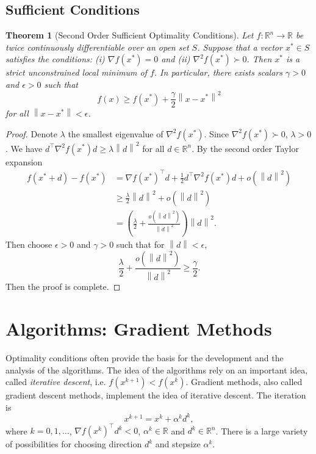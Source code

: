 \documentclass[12pt,a4paper]{report}
\numberwithin{equation}{section}
\theoremstyle{mystyle}
\newtheorem{theorem}[definition]{Theorem}
\newcommand{\R}{\mathbb{R}}
\newcommand{\grad}{\nabla}
\newcommand{\T}{\top}
\newcommand{\norm}[1]{\left\lVert #1 \right\rVert}
\begin{document}
	\subsection{Sufficient Conditions}
	\begin{theorem}[Second Order Sufficient Optimality Conditions]
		Let $f:\R^n \to \R$ be twice continuously differentiable over an open set $S$. Suppose that a vector $x^*\in S$ satisfies the conditions: (i) $\grad f(x^*)=0$ and (ii) $\grad^2 f(x^*)\succ 0$. Then $x^*$ is a strict unconstrained local minimum of $f$. In particular, there exists scalars $\gamma>0$ and $\epsilon>0$ such that
		$$
		f(x)\geq f(x^*)+\frac{\gamma}{2}\norm{x-x^*}^2
		$$
		for all $\norm{x-x^*}<\epsilon$.
	\end{theorem}
	\begin{proof}
		Denote $\lambda$ the smallest eigenvalue of $\grad^2 f(x^*)$. Since $\grad^2 f(x^*)\succ 0$, $\lambda >0$. We have $d^\T \grad^2 f(x^*)d \geq \lambda \norm{d}^2$ for all $d\in \R^n$. By the second order Taylor expansion
		\begin{align*}
			f(x^*+d)-f(x^*)&=\grad f(x^*)^\T d + \frac{1}{2} d^\T \grad^2 f(x^*)d+o(\norm{d}^2)\\
			&\geq \frac{\lambda}{2}\norm{d}^2+o(\norm{d}^2)\\
			&=\left(\frac{\lambda}{2}+\frac{o(\norm{d}^2)}{\norm{d}^2}\right)\norm{d}^2.
		\end{align*}
		Then choose $\epsilon>0$ and $\gamma>0$ such that for $\norm{d}<\epsilon$,
		$$
		\frac{\lambda}{2}+\frac{o(\norm{d}^2)}{\norm{d}^2}\geq \frac{\gamma}{2}.
		$$
		Then the proof is complete.
	\end{proof}



	\section{Algorithms: Gradient Methods}
	Optimality conditions often provide the basis for the development and the analysis of the algorithms. The idea of the algorithms rely on an important idea, called \emph{iterative descent}, i.e. $f(x^{k+1})<f(x^k)$. Gradient methods, also called gradient descent methods, implement the idea of iterative descent. The iteration is 
	\begin{equation}
		x^{k+1} = x^k + \alpha^k d^k,
	\end{equation}
	where $k=0,1,\dots$, $\grad f(x^k)^\T d^k<0$, $\alpha^k\in \R$ and $d^k\in \R^n$. There is a large variety of possibilities for choosing direction $d^k$ and stepsize $\alpha^k$.
	
\end{document}
